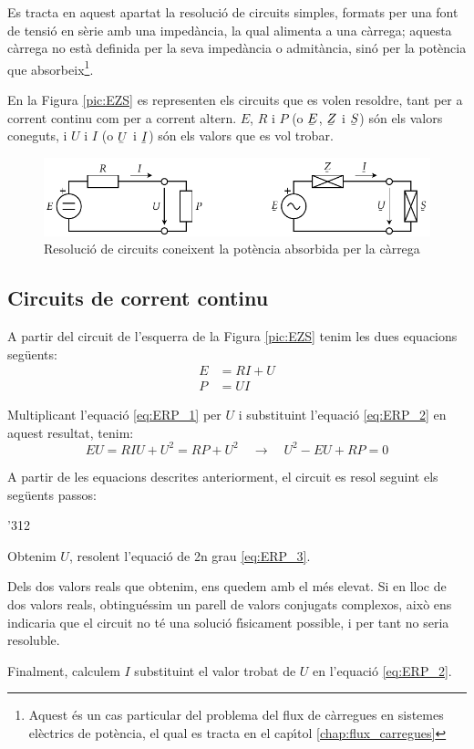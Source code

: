 Es tracta en aquest apartat la resoluci\'{o} de circuits simples,
formats per una font de tensi\'{o} en s\`{e}rie amb una imped\`{a}ncia, la qual
alimenta a una c\`{a}rrega; aquesta c\`{a}rrega no est\`{a} definida per la seva
imped\`{a}ncia o admit\`{a}ncia, sin\'{o} per la pot\`{e}ncia que absorbeix\footnote{Aquest \'{e}s un cas particular
del problema del flux de c\`{a}rregues en
sistemes el\`{e}ctrics de pot\`{e}ncia, el qual es tracta en el cap\'{\i}tol \ref{chap:flux_carregues}}.

En la Figura \vref{pic:EZS} es representen els circuits que es volen
resoldre, tant per a corrent continu com per a corrent altern. $E$,
$R$ i $P$ (o $\cmplx{E}$, $\cmplx{Z}$ i $\cmplx{S}$) s\'{o}n els valors
coneguts, i $U$ i $I$ (o $\cmplx{U}$ i $\cmplx{I}$) s\'{o}n els valors
que es vol trobar.
\begin{figure}[htb]
\vspace{3mm} \centering
   \includegraphics{Imatges/Cap-CalcBas-EZS.pdf}
\caption{Resoluci\'{o} de circuits coneixent la pot\`{e}ncia absorbida per la c\`{a}rrega} \label{pic:EZS}
\end{figure}

\subsection{Circuits de corrent continu}

A partir del circuit de l'esquerra de la Figura \vref{pic:EZS} tenim les dues equacions seg\"{u}ents:
\begin{align}
   E &= R I + U \label{eq:ERP_1} \\
   P &= U I     \label{eq:ERP_2}
\end{align}

Multiplicant l'equaci\'{o} \eqref{eq:ERP_1} per $U$ i substituint l'equaci\'{o} \eqref{eq:ERP_2} en aquest resultat, tenim:
\begin{equation}
   E U = R I U + U^2 = R P + U^2 \quad \rightarrow \quad U^2 - E U + R P = 0 \label{eq:ERP_3}
\end{equation}

A partir de les equacions descrites anteriorment, el circuit es resol seguint els seg\"{u}ents passos:
\begin{dingautolist}{'312}
   \item Obtenim $U$, resolent l'equaci\'{o} de 2n grau \eqref{eq:ERP_3}.
   \item Dels dos valors reals que obtenim, ens quedem amb el m\'{e}s elevat. Si en lloc de dos valors reals, obtingu\'{e}ssim
   un parell de valors conjugats complexos, aix\`{o} ens indicaria que el circuit no t\'{e} una soluci\'{o} f\'{\i}sicament possible, i per tant no seria resoluble.
   \item Finalment, calculem $I$ substituint el valor trobat de $U$ en l'equaci\'{o} \eqref{eq:ERP_2}.
\end{dingautolist}

